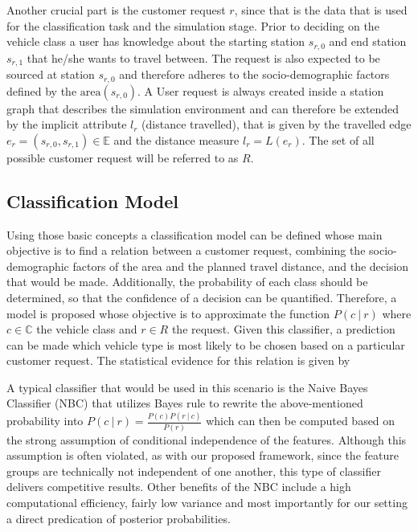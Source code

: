 Another crucial part is the customer request $r$, since that is the data that is used for the classification task and the simulation stage. Prior to deciding on the vehicle class a user has knowledge about
the starting station $s_{r, 0}$ and end station $s_{r, 1}$ that he/she wants to travel between. The request is also expected
to be sourced at station $s_{r, 0}$ and therefore adheres to the socio-demographic factors defined by the $\text{area}(s_{r, 0})$.
A User request is always created inside a station graph that describes the simulation environment and can therefore
be extended by the implicit attribute $l_r$ (distance travelled), that is given by the travelled edge $e_r = (s_{r, 0}, s_{r, 1}) \in \mathbb{E}$
and the distance measure $l_r = L(e_r)$. The set of all possible customer request will be referred to as $R$.

\subsection{Classification Model}
\label{sub_sec:Method/Class}

Using those basic concepts a classification model can be defined whose
main objective is to find a relation between a customer request, combining the socio-demographic factors of the area
and the planned travel distance, and the decision that would be made. Additionally,
the probability of each class should be determined, so that the confidence of a decision can be quantified. 
Therefore, a model is proposed whose objective is to
approximate the function $P(c \ | \ r)$ where $c \in \mathbb{C}$ the vehicle class and  $r \in R$ the request.
Given this classifier, a prediction can be made which vehicle type is most likely to be chosen based
on a particular customer request. The statistical evidence for this relation is given by  

A typical classifier that would be used in this scenario is the Naive Bayes Classifier (NBC) that utilizes
Bayes rule to rewrite the above-mentioned probability into $P(c \ | \ r) = \frac{P(c)P(r \ | \ c)}{P(r)}$
which can then be computed based on the strong assumption of conditional independence of the features.
Although this assumption is often violated, as with our proposed framework, since the feature groups
are technically not independent of one another, this type of classifier delivers competitive results.
Other benefits of the NBC include a high computational efficiency, fairly low variance
and most importantly for our setting a direct predication of posterior probabilities. \cite{Webb2010}

